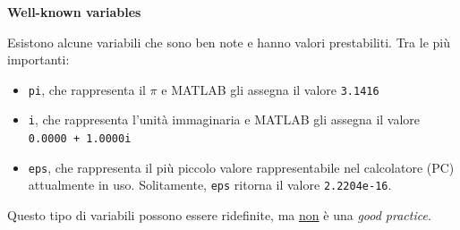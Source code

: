 \documentclass[a4paper]{article}
\begin{document}
    \begin{flushleft}
        \large
        \hypertarget{
            lab: Well-known variables
        }{
            \textcolor{Red3}{\textbf{Well-known variables}}
        }
        \label{lab: Well-known variables}
    \end{flushleft}
    Esistono alcune variabili che sono ben note e hanno valori prestabiliti. Tra le più importanti:
    \begin{itemize}
        \item \texttt{pi}, che rappresenta il $\pi$ e MATLAB gli assegna il valore \texttt{3.1416}
        
        \item \texttt{i}, che rappresenta l'unità immaginaria e MATLAB gli assegna il valore \texttt{0.0000 + 1.0000i}
        
        \item \texttt{eps}, che rappresenta il più piccolo valore rappresentabile nel calcolatore (PC) attualmente in uso. Solitamente, \texttt{eps} ritorna il valore \texttt{2.2204e-16}.
    \end{itemize}
    Questo tipo di variabili possono essere ridefinite, ma \underline{non} è una \emph{good practice}.

    \newpage
\end{document}
